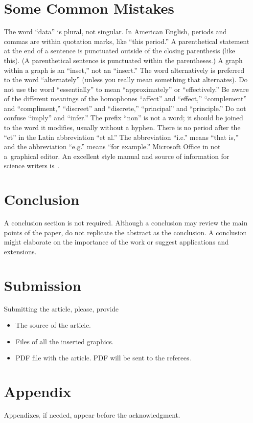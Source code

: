 \documentclass[conference]{IEEEtran}
\begin{document}
\section{Some Common Mistakes}
The word ``data'' is plural, not singular.  In American English, periods and commas are within quotation marks, like ``this period.''  A parenthetical statement at the end of a sentence is punctuated outside of the closing parenthesis (like this).  (A parenthetical sentence is punctuated within the parentheses.)  A graph within a graph is an ``inset,'' not an ``insert.''  The word alternatively is preferred to the word ``alternately'' (unless you really mean something that alternates).  Do not use the word ``essentially'' to mean ``approximately'' or ``effectively.''  Be aware of the different meanings of the homophones ``affect'' and ``effect,'' ``complement'' and ``compliment,'' ``discreet'' and ``discrete,'' ``principal'' and ``principle.''  Do not confuse ``imply'' and ``infer.''  The prefix ``non'' is not a word; it should be joined to the word it modifies, usually without a hyphen.  There is no period after the ``et'' in the Latin abbreviation ``et al.''  The abbreviation ``i.e.'' means ``that is,'' 
and the abbreviation ``e.g.'' means ``for example.'' Microsoft Office in not a~graphical editor. An excellent style manual and source of information for science writers is~\cite{c7}.

\section{Conclusion}
A conclusion section is not required. Although a conclusion may review the main points of the paper, do not replicate the abstract as the conclusion. A conclusion might elaborate on the importance of the work or suggest applications and extensions. 

\section{Submission}
Submitting the article, please, provide
\begin{itemize}
\item The source of the article.
\item Files of all the inserted graphics.
\item PDF file with the article. PDF will be sent to the referees.
\end{itemize}

\section*{Appendix}
Appendixes, if needed, appear before the acknowledgment.
\end{document}
